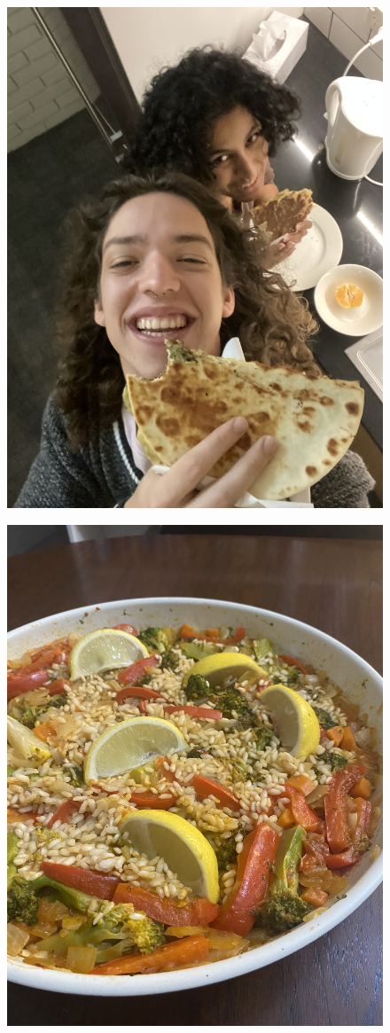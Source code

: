 \documentclass[]{article}
\begin{document}
\newpage\begin{figure}[H]
\begin{center}\hyperref[rec:Za'atar Munoushee]{\includegraphics[keepaspectratio,width=\textheight,height=\textwidth,angle=-90]{Gallery/Za'atar Munoushee}}\caption*{}\label{fig:Za'atar Munoushee}\end{center}
\end{figure}
\newpage\begin{figure}[H]
\begin{center}\hyperref[rec:Broccoli Paella]{\includegraphics[keepaspectratio,width=\textheight,height=\textwidth,angle=-90]{Gallery/Broccoli Paella}}\caption*{}\label{fig:Broccoli Paella}\end{center}
\end{figure}
\end{document}
